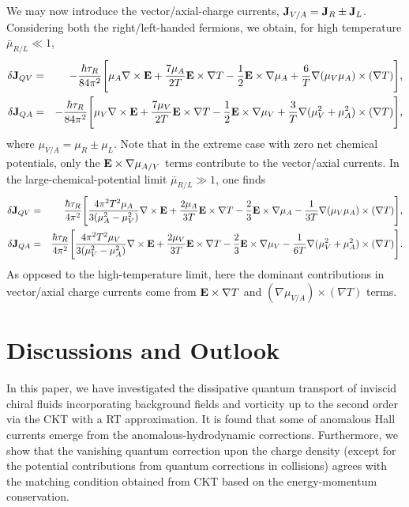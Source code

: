 \documentclass[aps,prd,showkeys,preprint,amsmath,amssymb,nofootinbib]{revtex4-1}
\begin{document}
We may now introduce the vector/axial-charge currents, ${\bf J}_{V/A}={\bf J}_R\pm {\bf J}_L$. Considering both the right/left-handed fermions, we obtain, for high temperature $\bar{\mu}_{R/L}\ll 1$, 
\begin{eqnarray}\nonumber\label{charge_J_VA_highT}
\delta {\bf J}_{QV}&=&-\frac{\hbar\tau_R}{84\pi^2}\Bigg[\mu_A\nabla\times{\bf E}+\frac{7\mu_A}{2T}{\bf E}\times\nabla T-\frac{1}{2}{\bf E}\times\nabla\mu_A+\frac{6}{T}\nabla(\mu_V\mu_A)\times(\nabla T)
\Bigg],
\\
\delta {\bf J}_{QA}&=&-\frac{\hbar\tau_R}{84\pi^2}\Bigg[\mu_V\nabla\times{\bf E}+\frac{7\mu_V}{2T}{\bf E}\times\nabla T-\frac{1}{2}{\bf E}\times\nabla\mu_V+\frac{3}{T}\nabla(\mu_V^2+\mu_A^2)\times(\nabla T)
\Bigg],
\end{eqnarray}
where $\mu_{V/A}=\mu_R\pm\mu_L$. Note that in the extreme case with zero net chemical potentials, only the ${\bf E}\times \nabla\mu_{A/V}$ terms contribute to the vector/axial currents. In the large-chemical-potential limit $\bar{\mu}_{R/L}\gg 1$, one finds 
\begin{eqnarray}\nonumber\label{charge_J_VA_lowT}
\delta {\bf J}_{QV}&=&\frac{\hbar\tau_R}{4\pi^2}\Bigg[\frac{4\pi^2 T^2\mu_A}{3(\mu_A^2-\mu_V^2)}\nabla\times{\bf E}+\frac{2\mu_A}{3T}{\bf E}\times\nabla T-\frac{2}{3}{\bf E}\times\nabla\mu_A-\frac{1}{3T}\nabla(\mu_V\mu_A)\times(\nabla T)
\Bigg],
\\
\delta {\bf J}_{QA}&=&\frac{\hbar\tau_R}{4\pi^2}\Bigg[\frac{4\pi^2 T^2\mu_V}{3(\mu_V^2-\mu_A^2)}\nabla\times{\bf E}+\frac{2\mu_V}{3T}{\bf E}\times\nabla T-\frac{2}{3}{\bf E}\times\nabla\mu_V-\frac{1}{6T}\nabla(\mu_V^2+\mu_A^2)\times(\nabla T)
\Bigg].
\end{eqnarray} 
As opposed to the high-temperature limit, here the dominant contributions in vector/axial charge currents come from ${\bf E}\times\nabla T$ and $(\nabla\mu_{V/A})\times(\nabla T)$ terms.    


\section{Discussions and Outlook}\label{Discussions_conclusions}
In this paper, we have investigated the dissipative quantum transport of inviscid chiral fluids incorporating background fields and vorticity up to the second order via the CKT with a RT approximation. It is found that some of anomalous Hall currents emerge from the anomalous-hydrodynamic corrections. Furthermore, we show that the vanishing quantum correction upon the charge density (except for the potential contributions from quantum corrections in collisions) agrees with the matching condition obtained from CKT based on the energy-momentum conservation. 
\end{document}
